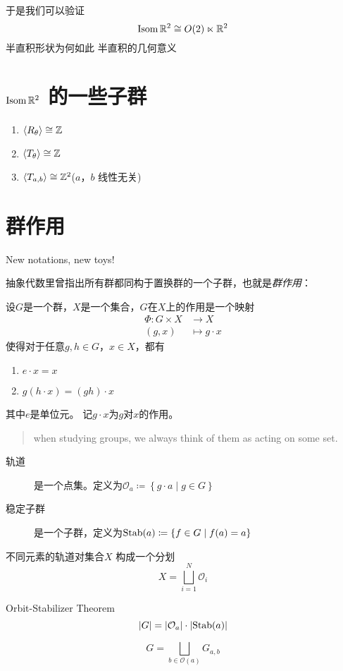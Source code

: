 于是我们可以验证
\[
    \operatorname{\mathrm{Isom}} \mathbb{R}^{2} \cong O(2) \ltimes \mathbb{R}^{2}
\]
半直积形状为何如此
半直积的几何意义

\section{\(\operatorname{\mathrm{Isom}} \mathbb{R}^{2}\) 的一些子群}
\begin{enumerate}
    \item \(\langle R_{\theta} \rangle\cong \mathbb{Z}\)
    \item \(\langle T_{\theta} \rangle\cong \mathbb{Z}\)
    \item \(\langle T_{a,b} \rangle\cong \mathbb{Z}^{2}\)(\(a\)，\(b\) 线性无关)
\end{enumerate}

\section{群作用}
New notations, new toys!

抽象代数里曾指出所有群都同构于置换群的一个子群，也就是\textit{群作用}：

\begin{definition}
    设\(G\)是一个群，\(X\)是一个集合，\(G\)在\(X\)上的作用是一个映射
    \begin{align*}
        \Phi: G\times X & \to X \\
        (g,x) & \mapsto g\cdot x
    \end{align*}
    使得对于任意\(g,h\in G\)，\(x\in X\)，都有
    \begin{enumerate}
        \item \(e\cdot x=x\)
        \item \(g(h\cdot x)=(gh)\cdot x\)
    \end{enumerate}
    其中\(e\)是单位元。
    记\(g\cdot x\)为\(g\)对\(x\)的作用。
\end{definition}

\begin{quote}
    when studying groups, we always think of them as acting
    on some set.
\end{quote}


\begin{description}
    \item[轨道]  是一个点集。定义为\(\mathcal{O}_{a}\coloneqq \left\{ g\cdot a
        \mid g\in G \right\}\)
    \item[稳定子群] 是一个子群，定义为\(\operatorname{\mathrm{Stab}}(a)\coloneqq \left\{ f \in G
        \mid f(a)=a \right\}\)
\end{description}

不同元素的轨道对集合\(X\) 构成一个分划
\[
    X=\bigsqcup_{i=1}^{N} \mathcal{O}_{i}
\]


Orbit-Stabilizer Theorem
\[
    \left| G \right| = \left| \mathcal{O}_{a} \right| \cdot
    \left| \operatorname{\mathrm{Stab}}(a) \right|
\]

\[
    G= \bigsqcup_{b\in \mathcal{O}(a)} G_{a,b}
\]


